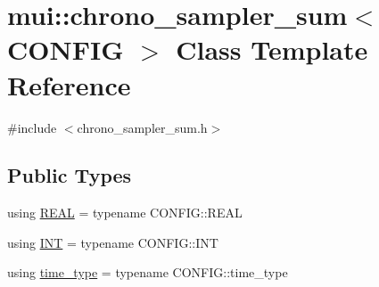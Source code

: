 \hypertarget{classmui_1_1chrono__sampler__sum}{}\section{mui\+:\+:chrono\+\_\+sampler\+\_\+sum$<$ C\+O\+N\+F\+IG $>$ Class Template Reference}
\label{classmui_1_1chrono__sampler__sum}


{\ttfamily \#include $<$chrono\+\_\+sampler\+\_\+sum.\+h$>$}

\subsection*{Public Types}
\begin{DoxyCompactItemize}
\item 
using \hyperlink{classmui_1_1chrono__sampler__sum_a899d123aab70426cddf903d1e7c7b888}{R\+E\+AL} = typename C\+O\+N\+F\+I\+G\+::\+R\+E\+AL
\item 
using \hyperlink{classmui_1_1chrono__sampler__sum_a40d6bae882beef550b2e2315dc91af92}{I\+NT} = typename C\+O\+N\+F\+I\+G\+::\+I\+NT
\item 
using \hyperlink{classmui_1_1chrono__sampler__sum_ada1a39bc0845e79c00e7aed8b55e8fb2}{time\+\_\+type} = typename C\+O\+N\+F\+I\+G\+::time\+\_\+type
\end{DoxyCompactItemize}
